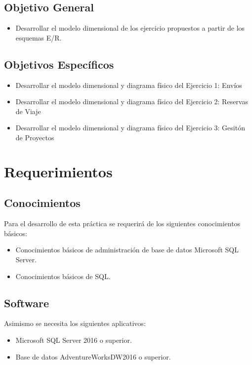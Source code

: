 \documentclass[12pt,letterpaper]{article}
\begin{document}
\subsection{\textbf{Objetivo General}}

\begin{itemize}
\item Desarrollar el modelo dimensional de los ejercicio propuestos a partir de los esquemas E/R.

\end{itemize}


\subsection{\textbf{Objetivos Específicos}}
\begin{itemize}
\item Desarrollar el modelo dimensional y diagrama físico del Ejercicio 1: Envíos
\item Desarrollar el modelo dimensional y diagrama físico del Ejercicio 2: Reservas de Viaje
\item Desarrollar el modelo dimensional y diagrama físico del Ejercicio 3: Gesitón de Proyectos
\end{itemize}

\section {\textbf{Requerimientos}}

\subsection{\textbf{Conocimientos}}
Para el desarrollo de esta práctica se requerirá de los siguientes conocimientos básicos:
\begin{itemize}
\item Conocimientos básicos de administración de base de datos Microsoft SQL Server.
\item Conocimientos básicos de SQL.
\end{itemize}



\subsection{\textbf{Software}}
Asimismo se necesita los siguientes aplicativos:
\begin{itemize}
\item Microsoft SQL Server 2016 o superior.
\item Base de datos AdventureWorksDW2016 o superior.
\end{itemize}
\end{document}
